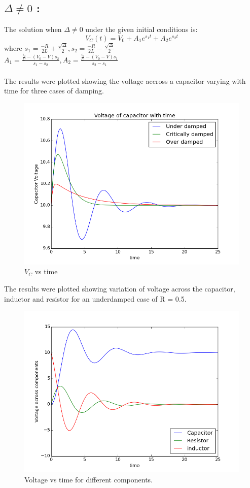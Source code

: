 \documentclass[12pt, a4paper]{report}
\begin{document}
\subsection*{$\Delta \ne 0$ :}
The solution when $\Delta \ne 0$ under the given initial conditions is:
\begin{equation}
 V_C(t) = V_0 + A_1e^{s_1t} + A_2e^{s_2t}
\end{equation}
where $s_1 = \frac{-R}{2L} + \frac{\sqrt{\Delta}}{2} , s_2 = \frac{-R}{2L} - \frac{\sqrt{\Delta}}{2}$ \\
$A_1 = \frac{\frac{i_0}{C} - (V_0 - V)s_2}{s_1 - s_2} , A_2 = \frac{\frac{i_0}{C} - (V_0 - V)s_1}{s_2 - s_1}$ \\
\\

The results were plotted showing the voltage accross a capacitor varying with time for three cases of damping.
\begin{figure}[H]
 \centering
 \includegraphics[width = \textwidth]{VC.png}
 \caption{$V_C$ vs time}
 \label{VC}
\end{figure}

The results were plotted showing variation of voltage across the capacitor, inductor and resistor for an underdamped case of R = 0.5.
\begin{figure}[H]
 \centering
 \includegraphics[width = \textwidth]{V.png}
 \caption{Voltage vs time for different components.}
 \label{V}
\end{figure}
\end{document}

